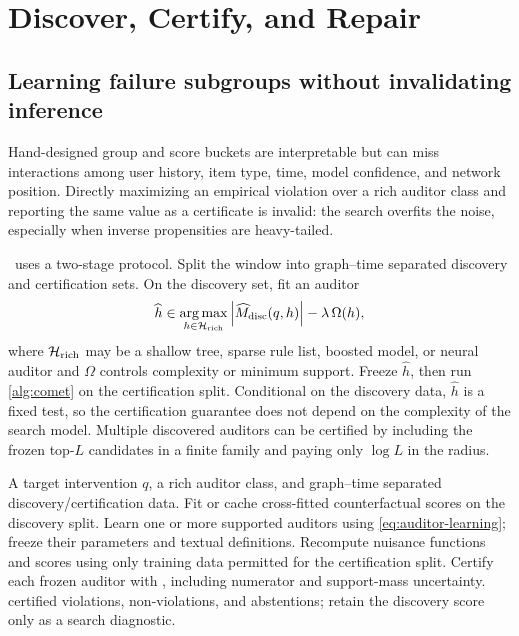 \section{Discover, Certify, and Repair}
\label{sec:discover-repair}

\subsection{Learning failure subgroups without invalidating inference}
Hand-designed group and score buckets are interpretable but can miss interactions among user history, item type, time, model confidence, and network position. Directly maximizing an empirical violation over a rich auditor class and reporting the same value as a certificate is invalid: the search overfits the noise, especially when inverse propensities are heavy-tailed.

\COMET\ uses a two-stage protocol. Split the window into graph--time separated discovery and certification sets. On the discovery set, fit an auditor
\begin{equation}
\widehat h
\in\operatorname*{arg\,max}_{h\in\mathcal{H}_{\mathrm{rich}}}
\left|\widehat M_{\mathrm{disc}}(q,h)\right|
-\lambda\,\Omega(h),
\label{eq:auditor-learning}
\end{equation}
where $\mathcal{H}_{\mathrm{rich}}$ may be a shallow tree, sparse rule list, boosted model, or neural auditor and $\Omega$ controls complexity or minimum support. Freeze $\widehat h$, then run \cref{alg:comet} on the certification split. Conditional on the discovery data, $\widehat h$ is a fixed test, so the certification guarantee does not depend on the complexity of the search model. Multiple discovered auditors can be certified by including the frozen top-$L$ candidates in a finite family and paying only $\log L$ in the radius.

\begin{algorithm}[t]
\caption{Discover--certify auditing}
\label{alg:discover}
\begin{algorithmic}[1]
\Require A target intervention $q$, a rich auditor class, and graph--time separated discovery/certification data.
\State Fit or cache cross-fitted counterfactual scores on the discovery split.
\State Learn one or more supported auditors using \cref{eq:auditor-learning}; freeze their parameters and textual definitions.
\State Recompute nuisance functions and scores using only training data permitted for the certification split.
\State Certify each frozen auditor with \COMET, including numerator and support-mass uncertainty.
\State \Return certified violations, non-violations, and abstentions; retain the discovery score only as a search diagnostic.
\end{algorithmic}
\end{algorithm}

